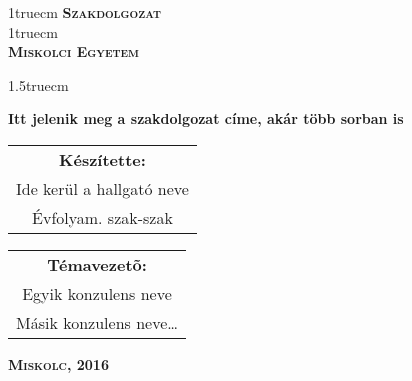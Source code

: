 \pagestyle{empty} %

{\large
\begin{center}
\vglue 1truecm
\textbf{\huge\textsc{Szakdolgozat}}\\
\vglue 1truecm
\\
\textbf{\textsc{Miskolci Egyetem}}
\end{center}}

\vglue 1.5truecm %

{\LARGE
\begin{center}
\textbf{Itt jelenik meg a szakdolgozat címe, akár több sorban is}
\end{center}}

\vspace*{2.5truecm}
{\large
\begin{center}
\begin{tabular}{c}
\textbf{Készítette:}\\
Ide kerül a hallgató neve\\
Évfolyam. szak-szak
\end{tabular}
\end{center}
\begin{center}
\begin{tabular}{c}
\textbf{Témavezetõ:}\\
Egyik konzulens neve\\
Másik konzulens neve\ldots
\end{tabular}
\end{center}}
\vfill
{\large
\begin{center}
\textbf{\textsc{Miskolc, 2016}}
\end{center}}

\newpage
